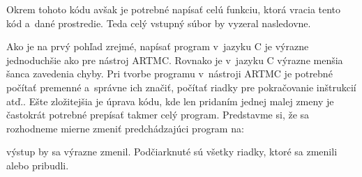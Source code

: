 \noindent
Okrem tohoto kódu avšak je potrebné napísať celú funkciu, ktorá vracia tento kód a~dané prostredie.
Teda celý vstupný súbor by vyzeral nasledovne.


\noindent
Ako je na prvý pohľad zrejmé, napísať program v~jazyku C je výrazne jednoduchšie ako pre nástroj ARTMC. Rovnako je v~jazyku C výrazne menšia šanca zavedenia chyby. Pri tvorbe programu v~nástroji ARTMC je potrebné počítať premenné a~správne ich značiť, počítať riadky pre pokračovanie inštrukcií atď.. Ešte zložitejšia je úprava kódu, kde len pridaním jednej malej zmeny je častokrát potrebné prepísať takmer celý program. Predstavme si, že sa rozhodneme mierne zmeniť predchádzajúci program na:


\noindent
výstup by sa výrazne zmenil. Podčiarknuté sú všetky riadky, ktoré sa zmenili alebo pribudli.

